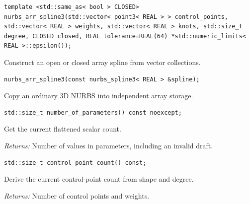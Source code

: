\par\noindent\begin{minipage}{\linewidth}
\begin{lstlisting}[style=apireference]
template <std::same_as< bool > CLOSED>
nurbs_arr_spline3(std::vector< point3< REAL > > control_points, std::vector< REAL > weights, std::vector< REAL > knots, std::size_t degree, CLOSED closed, REAL tolerance=REAL(64) *std::numeric_limits< REAL >::epsilon());
\end{lstlisting}
{\footnotesize Construct an open or closed array spline from vector collections.\par}
\end{minipage}\par\vspace{1pt}
\par\noindent\begin{minipage}{\linewidth}
\begin{lstlisting}[style=apireference]
nurbs_arr_spline3(const nurbs_spline3< REAL > &spline);
\end{lstlisting}
{\footnotesize Copy an ordinary 3D NURBS into independent array storage.\par}
\end{minipage}\par\vspace{1pt}
\par\noindent\begin{minipage}{\linewidth}
\begin{lstlisting}[style=apireference]
std::size_t number_of_parameters() const noexcept;
\end{lstlisting}
{\footnotesize Get the current flattened scalar count.\par}
{\footnotesize\textit{Returns:} Number of values in parameters, including an invalid draft.\par}
\end{minipage}\par\vspace{1pt}
\par\noindent\begin{minipage}{\linewidth}
\begin{lstlisting}[style=apireference]
std::size_t control_point_count() const;
\end{lstlisting}
{\footnotesize Derive the current control-point count from shape and degree.\par}
{\footnotesize\textit{Returns:} Number of control points and weights.\par}
\end{minipage}\par\vspace{1pt}
